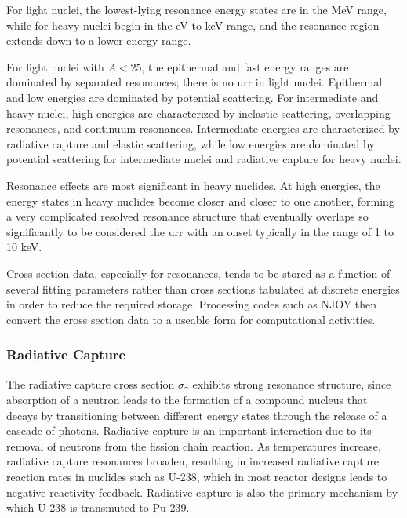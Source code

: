 For light nuclei, the lowest-lying resonance energy states are in the MeV range, while for heavy nuclei begin in the eV to keV range, and the resonance region extends down to a lower energy range.

For light nuclei with \(A<25\), the epithermal and fast energy ranges are dominated by separated resonances; there is no \gls{urr} in light nuclei. Epithermal and low energies are dominated by potential scattering. For intermediate and heavy nuclei, high energies are characterized by inelastic scattering, overlapping resonances, and continuum resonances. Intermediate energies are characterized by radiative capture and elastic scattering, while low energies are dominated by potential scattering for intermediate nuclei and radiative capture for heavy nuclei.

Resonance effects are most significant in heavy nuclides. At high energies, the energy states in heavy nuclides become closer and closer to one another, forming a very complicated resolved resonance structure that eventually overlaps so significantly to be considered the \gls{urr} with an onset typically in the range of 1 to 10 keV.


Cross section data, especially for resonances, tends to be stored as a function of several fitting parameters rather than cross sections tabulated at discrete energies in order to reduce the required storage. Processing codes such as NJOY then convert the cross section data to a useable form for computational activities. 

\subsubsection{Radiative Capture}

The radiative capture cross section \(\sigma_\gamma\) exhibits strong resonance structure, since absorption of a neutron leads to the formation of a compound nucleus that decays by transitioning between different energy states through the release of a cascade of photons. Radiative capture is an important interaction due to its removal of neutrons from the fission chain reaction. As temperatures increase, radiative capture resonances broaden, resulting in increased radiative capture reaction rates in nuclides such as U-238, which in most reactor designs leads to negative reactivity feedback. Radiative capture is also the primary mechanism by which U-238 is transmuted to Pu-239.

